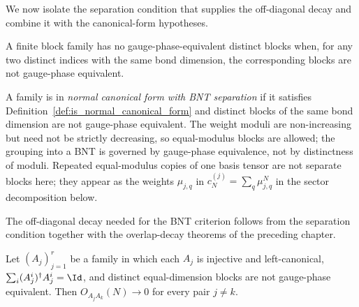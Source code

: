 We now isolate the separation condition that supplies the off-diagonal decay
and combine it with the canonical-form hypotheses.

\begin{definition}%
    \label{def:blocks_not_gauge_phase_equiv}
    \leanok
    A finite block family has no gauge-phase-equivalent distinct blocks when,
    for any two distinct indices with the same bond dimension, the corresponding
    blocks are not gauge-phase equivalent.
\end{definition}

\begin{definition}\label{def:normal_cf_bnt}
    \leanok
    A family is in \emph{normal canonical form with BNT separation} if it
    satisfies Definition~\ref{def:is_normal_canonical_form} and distinct blocks
    of the same bond dimension are not gauge-phase equivalent. The weight moduli
    are non-increasing but need not be strictly decreasing, so equal-modulus
    blocks are allowed; the grouping into a BNT is governed by gauge-phase
    equivalence, not by distinctness of moduli. Repeated equal-modulus copies of
    one basis tensor are not separate blocks here; they appear as the weights
    $\mu_{j,q}$ in $c_N^{(j)} = \sum_q \mu_{j,q}^N$ in the sector decomposition
    below.
\end{definition}

The off-diagonal decay needed for the BNT criterion follows from the separation
condition together with the overlap-decay theorems of the preceding chapter.

\begin{theorem}
    \label{thm:cross_overlap_zero_split}
    \leanok
    Let $(A_j)_{j=1}^r$ be a family in which each $A_j$ is injective and
    left-canonical, $\sum_i (A_j^i)^\dagger A_j^i = \Id$, and distinct
    equal-dimension blocks are not gauge-phase equivalent. Then
    $O_{A_jA_k}(N) \to 0$ for every pair $j \neq k$.
\end{theorem}

